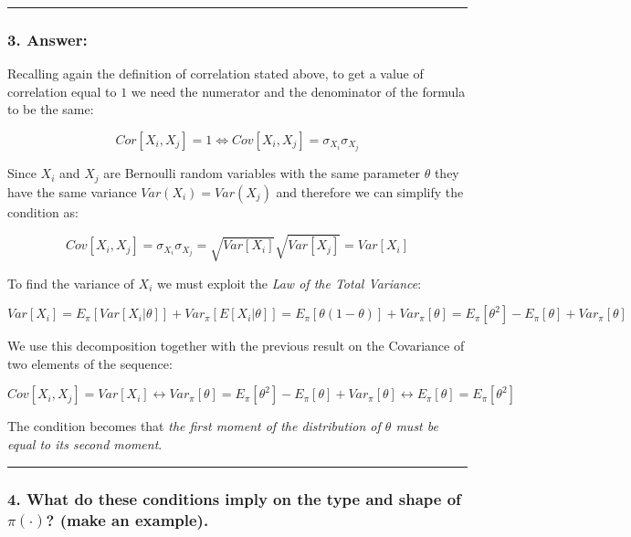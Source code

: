 \documentclass[
]{article}
\begin{document}
\begin{center}\rule{0.5\linewidth}{0.5pt}\end{center}

\hypertarget{answer-12}{%
\subsubsection{3. Answer:}\label{answer-12}}

Recalling again the definition of correlation stated above, to get a
value of correlation equal to \(1\) we need the numerator and the
denominator of the formula to be the same:

\[
Cor[X_i, X_j] = 1 \iff
Cov[X_i, X_j] = \sigma_{X_i}\sigma_{X_j}
\]

Since \(X_i\) and \(X_j\) are Bernoulli random variables with the same
parameter \(\theta\) they have the same variance \(Var(X_i) = Var(X_j)\)
and therefore we can simplify the condition as:

\[
Cov[X_i, X_j] = \sigma_{X_i}\sigma_{X_j} = 
\sqrt{Var[X_i]} \sqrt{Var[X_j]} =
Var[X_i]
\]

To find the variance of \(X_i\) we must exploit the \emph{Law of the
Total Variance}:

\[
Var[X_i] = E_\pi[Var[X_i|\theta]] + Var_\pi[E[X_i | \theta]] =
E_\pi[\theta(1-\theta)]+Var_\pi[\theta] = 
E_\pi[\theta^2] - E_\pi[\theta] + Var_\pi[\theta]
\]

We use this decomposition together with the previous result on the
Covariance of two elements of the sequence:

\[
Cov[X_i, X_j] = Var[X_i] \leftrightarrow
Var_\pi[\theta] = E_\pi[\theta^2] - E_\pi[\theta] + Var_\pi[\theta] \leftrightarrow
E_\pi[\theta] = E_\pi[\theta^2]
\]

The condition becomes that \emph{the first moment of the distribution of
\(\theta\) must be equal to its second moment}.

\begin{center}\rule{0.5\linewidth}{0.5pt}\end{center}

\hypertarget{what-do-these-conditions-imply-on-the-type-and-shape-of-picdot-make-an-example.}{%
\subsubsection{\texorpdfstring{4. What do these conditions imply on the
type and shape of \(\pi(\cdot)\)? (make an
example).}{4. What do these conditions imply on the type and shape of \textbackslash pi(\textbackslash cdot)? (make an example).}}\label{what-do-these-conditions-imply-on-the-type-and-shape-of-picdot-make-an-example.}}
\end{document}
